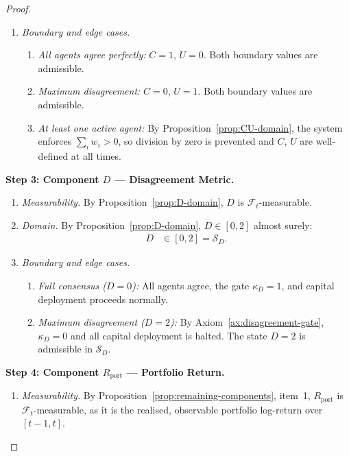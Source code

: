 \documentclass[12pt,openany]{book}
\newcommand{\calF}{\mathcal{F}}
\numberwithin{equation}{chapter}
\theoremstyle{plain}
\theoremstyle{definition}
\theoremstyle{remark}
\numberwithin{equation}{chapter}
\theoremstyle{plain}
\begin{document}
\begin{proof}
\begin{enumerate}
  \item \emph{Boundary and edge cases.}
    \begin{enumerate}
      \item \emph{All agents agree perfectly:}
        $C = 1$, $U = 0$.  Both boundary values are admissible.
      \item \emph{Maximum disagreement:}
        $C = 0$, $U = 1$.  Both boundary values are admissible.
      \item \emph{At least one active agent:}
        By Proposition~\ref{prop:CU-domain}, the system enforces
        $\sum_i w_i > 0$, so division by zero is prevented and
        $C$, $U$ are well-defined at all times.
    \end{enumerate}
\end{enumerate}

\medskip
\noindent\textbf{Step 3: Component $D$ — Disagreement Metric.}
\begin{enumerate}
  \item \emph{Measurability.}
    By Proposition~\ref{prop:D-domain}, $D$ is
    $\calF_t$-measurable.

  \item \emph{Domain.}
    By Proposition~\ref{prop:D-domain}, $D \in [0, 2]$
    almost surely:
    \begin{align}
      D
        &\in [0, 2]
         = \mathcal{S}_D.
    \end{align}

  \item \emph{Boundary and edge cases.}
    \begin{enumerate}
      \item \emph{Full consensus ($D = 0$):}  All agents agree,
        the gate $\kappa_D = 1$, and capital deployment
        proceeds normally.
      \item \emph{Maximum disagreement ($D = 2$):}
        By Axiom~\ref{ax:disagreement-gate}, $\kappa_D = 0$
        and all capital deployment is halted.  The state
        $D = 2$ is admissible in $\mathcal{S}_D$.
    \end{enumerate}
\end{enumerate}

\medskip
\noindent\textbf{Step 4: Component $R_{\mathrm{port}}$ —
Portfolio Return.}
\begin{enumerate}
  \item \emph{Measurability.}
    By Proposition~\ref{prop:remaining-components}, item~1,
    $R_{\mathrm{port}}$ is $\calF_t$-measurable, as it is
    the realised, observable portfolio log-return over
    $[t-1, t]$.


\end{enumerate}
\end{proof}
\end{document}
